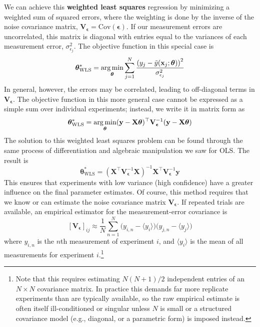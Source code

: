 We can achieve this \textbf{weighted least squares} regression by minimizing a weighted sum of squared errors, where the weighting is done by the inverse of the noise covariance matrix, $\mathbf{V}_{\boldsymbol{\epsilon}} = \text{Cov}(\boldsymbol{\epsilon})$. If our measurement errors are uncorrelated, this matrix is diagonal with entries equal to the variances of each measurement error, $\sigma_{\epsilon_j}^2$. The objective function in this special case is 
\begin{equation}
    \boldsymbol{\theta}^*_\text{WLS} = \operatorname*{arg\,min}_{\boldsymbol{\theta}} \sum_{j=1}^N \frac{ \left(y_j - \tilde{y}(\mathbf{x}_j; \boldsymbol{\theta})\right)^2}{\sigma_{\epsilon_j}^2}
\end{equation}
In general, however, the errors may be correlated, leading to off-diagonal terms in $\mathbf{V}_{\boldsymbol{\epsilon}}$. The objective function in this more general case cannot be expressed as a simple sum over individual experiments; instead, we write it in matrix form as
\begin{equation}
    \boldsymbol{\theta}^*_\text{WLS} = \operatorname*{arg\,min}_{\boldsymbol{\theta}} (\mathbf{y} - \mathbf{X}\boldsymbol{\theta})^\top \mathbf{V}_{\boldsymbol{\epsilon}}^{-1} (\mathbf{y} - \mathbf{X}\boldsymbol{\theta})
\end{equation}
The solution to this weighted least squares problem can be found through the same process of differentiation and algebraic manipulation we saw for OLS. The result is
\begin{equation}
    \boldsymbol{\theta}^*_\text{WLS} = (\mathbf{X}^\top\mathbf{V}_{\boldsymbol{\epsilon}}^{-1}\mathbf{X})^{-1}\mathbf{X}^\top\mathbf{V}_{\boldsymbol{\epsilon}}^{-1}\mathbf{y}
\end{equation}
This ensures that experiments with low variance (high confidence) have a greater influence on the final parameter estimates. Of course, this method requires that we know or can estimate the noise covariance matrix $\mathbf{V}_{\boldsymbol{\epsilon}}$. If repeated trials are available, an empirical estimator for the measurement-error covariance is
\begin{equation*}
    \left[\mathbf{V}_{\boldsymbol{\epsilon}}\right]_{ij} \approx \frac{1}{N} \sum_{n=1}^{N} \big(y_{i,n} - \langle y_i\rangle\big)\big(y_{j,n} - \langle y_j\rangle\big)
\end{equation*}
where $y_{i,n}$ is the $n$th measurement of experiment $i$, and $\langle y_i \rangle$ is the mean of all measurements for experiment $i$.\footnote{Note that this requires estimating $N(N+1)/2$ independent entries of an $N\times N$ covariance matrix. In practice this demands far more replicate experiments than are typically available, so the raw empirical estimate is often itself ill-conditioned or singular unless $N$ is small or a structured covariance model (e.g., diagonal, or a parametric form) is imposed instead.}
